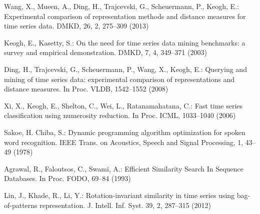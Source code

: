\documentclass[conference]{IEEEtran}
\begin{document}

%
%
\begin{thebibliography}{5}
Wang, X., Mueen, A., Ding, H., Trajcevski, G., Scheuermann, P., Keogh, E.:
Experimental comparison of representation methods and distance measures for time series data.
DMKD, 26, 2, 275--309 (2013)


Keogh, E., Kasetty, S.:
On the need for time series data mining benchmarks: a survey and empirical demonstration.
DMKD, 7, 4, 349--371 (2003)

Ding, H., Trajcevski, G., Scheuermann, P., Wang, X., Keogh, E.:
Querying and mining of time series data: experimental comparison of representations and distance
measures. 
In Proc. VLDB, 1542--1552 (2008)

Xi, X., Keogh, E., Shelton, C., Wei, L., Ratanamahatana, C.:
Fast time series classification using numerosity reduction. 
In Proc. ICML, 1033--1040 (2006)

Sakoe, H. Chiba, S.:
Dynamic programming algorithm optimization for spoken word recognition.
IEEE Trans. on Acoustics, Speech and Signal Processing, 1, 43--49 (1978)

	

Agrawal, R., Faloutsos, C., Swami, A.:
Efficient Similarity Search In Sequence Databases.
In Proc. FODO, 69--84 (1993)

Lin, J., Khade, R., Li, Y.:
Rotation-invariant similarity in time series using bag-of-patterns representation. 
J. Intell. Inf. Syst. 39, 2, 287--315 (2012)


\end{thebibliography}
\end{document}
